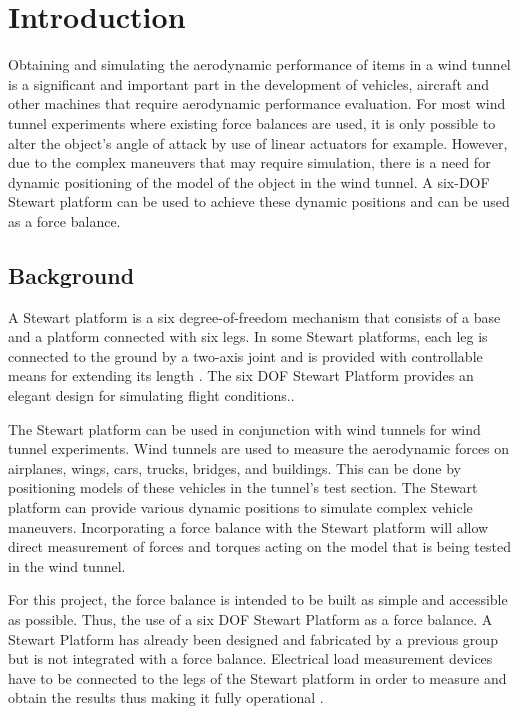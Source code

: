 \section{Introduction}
\label{sec:introduction}
Obtaining and simulating the aerodynamic performance of items in a wind tunnel is a
significant and important part in the development of vehicles, aircraft and other machines
that require aerodynamic performance evaluation. For most wind tunnel experiments where existing force balances are used,
it is only possible to alter the object's angle of attack by use of linear  actuators for example.
However, due to the complex maneuvers that
may require simulation, there is a need for dynamic positioning of the model of the object
in the wind tunnel. A six-DOF Stewart platform can be used to achieve these dynamic positions and can be used as a force balance.
\subsection{Background}
A Stewart platform is a six degree-of-freedom mechanism that consists of a base and a platform connected with six legs. In some Stewart platforms,
each leg is connected to the ground by a two-axis joint and is provided with controllable means for extending its length
\cite{wittenburg2016stewart}. The six DOF Stewart Platform provides an elegant design for simulating flight conditions.\cite{stewart1965platform}. 

The Stewart platform can be used in conjunction with wind tunnels for wind tunnel experiments. Wind tunnels are used to measure the aerodynamic forces on airplanes, wings, cars, trucks, bridges, and buildings. This can be done by positioning models of these vehicles in the tunnel's test section. 
The Stewart platform can provide various dynamic positions to simulate complex vehicle maneuvers. Incorporating a force balance with the Stewart platform will allow direct measurement of forces and torques acting on the model that is being tested in the wind tunnel.

For this project, the force balance is intended to be built as simple and accessible as possible. Thus, the use of a six DOF Stewart Platform as a force balance. 
A Stewart Platform has already been designed and fabricated by a previous group but is not integrated with a force balance. 
Electrical load measurement devices have to be connected to the legs of the Stewart platform in order to measure and obtain the results thus making it fully operational \cite{caleb}.


